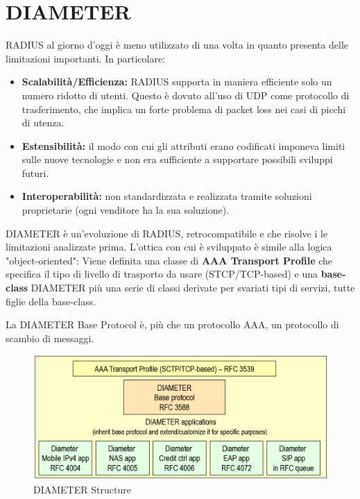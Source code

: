 \section{DIAMETER}
RADIUS al giorno d'oggi è meno utilizzato di una volta in quanto presenta delle limitazioni importanti. In particolare:
\begin{itemize}
    \item \textbf{Scalabilità/Efficienza:} RADIUS supporta in maniera efficiente solo un numero ridotto di utenti. Questo è dovuto all'uso di UDP come protocollo di trasferimento, che implica un forte problema di packet loss nei casi di picchi di utenza.
    \item \textbf{Estensibilità:} il modo con cui gli attributi erano codificati imponeva limiti sulle nuove tecnologie e non era sufficiente a supportare possibili sviluppi futuri.
    \item \textbf{Interoperabilità:} non standardizzata e realizzata tramite soluzioni proprietarie (ogni venditore ha la sua soluzione).
\end{itemize}
DIAMETER è un'evoluzione di RADIUS, retrocompatibile e che risolve i le limitazioni analizzate prima. L'ottica con cui è sviluppato è simile alla logica "object-oriented": Viene definita una classe di \textbf{AAA Transport Profile} che specifica il tipo di livello di trasporto da usare (STCP/TCP-based) e una \textbf{base-class} DIAMETER più una serie di classi derivate per svariati tipi di servizi, tutte figlie della base-class.
\begin{remark}
La DIAMETER Base Protocol è, più che un protocollo AAA, un protocollo di scambio di messaggi. 
\end{remark}
\begin{figure}[h]
    \centering
    \includegraphics[width=\linewidth]{image/diameter.png}
    \caption{DIAMETER Structure}
    \label{fig:diameter}
\end{figure}
